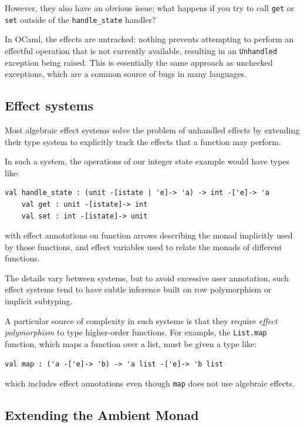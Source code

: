 \documentclass[acmsmall, screen, review, anonymous]{acmart}
\theoremstyle{definition}
\begin{document}
However, they also have an obvious issue: what happens if you try to
call \lstinline[style=oxcaml]{get} or \lstinline[style=oxcaml]{set}
outside of the \lstinline[style=oxcaml]{handle_state} handler?

In OCaml, the effects are untracked: nothing prevents attempting to
perform an effectful operation that is not currently available,
resulting in an \lstinline[style=oxcaml]{Unhandled} exception being
raised. This is essentially the same approach as unchecked exceptions,
which are a common source of bugs in many languages.

\subsection{Effect systems}

Most algebraic effect systems \cite{hillerstrom2016liberating,
leijen2014koka, convent2020doo,
biernacki2019binders, brachthauser2020effects,
xie2022first} solve the problem of unhandled effects by extending
their type system to explicitly track the effects that a function may
perform.

In such a system, the operations of our integer state example would have
types like:
\begin{lstlisting}[style=oxcaml]
    val handle_state : (unit -[istate | 'e]-> 'a) -> int -['e]-> 'a
    val get : unit -[istate]-> int
    val set : int -[istate]-> unit
\end{lstlisting}
with effect annotations on function arrows describing the monad
implicitly used by those functions, and effect variables used to relate
the monads of different functions.

The details vary between systems, but to avoid excessive user
annotation, such effect systems tend to have subtle inference built on
row polymorphism \cite{hillerstrom2016liberating, leijen2014koka} or implicit subtyping.

A particular source of complexity in such systems is that they require
\emph{effect polymorphism} to type higher-order functions. For example,
the \lstinline[style=oxcaml]{List.map} function, which maps a function
over a list, must be given a type like:
\begin{lstlisting}[style=oxcaml]
    val map : ('a -['e]-> 'b) -> 'a list -['e]-> 'b list
\end{lstlisting}
which includes effect annotations even though
\lstinline[style=oxcaml]{map} does not use algebraic effects.

\subsection{Extending the Ambient Monad}
\end{document}
